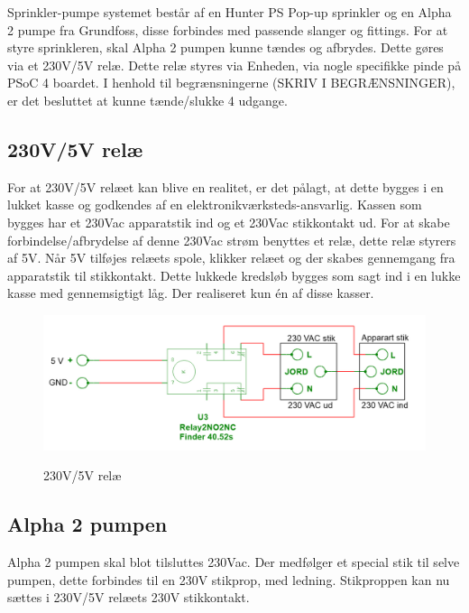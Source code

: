 Sprinkler-pumpe systemet består af en Hunter PS Pop-up sprinkler og en Alpha 2 pumpe fra Grundfoss, disse forbindes med passende slanger og fittings. For at styre sprinkleren, skal Alpha 2 pumpen kunne tændes og afbrydes. Dette gøres via et 230V/5V relæ. Dette relæ styres via Enheden, via nogle specifikke pinde på PSoC 4 boardet. I henhold til begrænsningerne (SKRIV I BEGRÆNSNINGER), er det besluttet at kunne tænde/slukke 4 udgange.





\subsection{230V/5V relæ}

For at 230V/5V relæet kan blive en realitet, er det pålagt, at dette bygges i en lukket kasse og godkendes af en elektronikværksteds-ansvarlig. Kassen som bygges har et 230Vac apparatstik ind og et 230Vac stikkontakt ud. For at skabe forbindelse/afbrydelse af denne 230Vac strøm benyttes et relæ, dette relæ styrers af 5V. Når 5V  tilføjes relæets spole, klikker relæet og der skabes gennemgang fra apparatstik til stikkontakt. Dette lukkede kredsløb bygges som sagt ind i en lukke kasse med gennemsigtigt låg. Der realiseret kun én af disse kasser.

\begin{figure}[H] \centering
{\includegraphics[width=\textwidth]{filer/design/Billeder/230VAC_KREDS}}
\caption{230V/5V relæ}
\label{lab:RELAY}
\raggedright
\end{figure}

\subsection{Alpha 2 pumpen}

Alpha 2 pumpen skal blot tilsluttes 230Vac. Der medfølger et special stik til selve pumpen, dette forbindes til en 230V stikprop, med ledning. Stikproppen kan nu sættes i 230V/5V relæets 230V stikkontakt.

